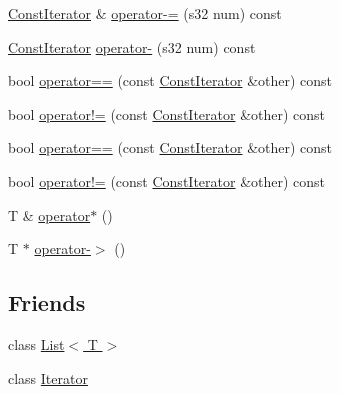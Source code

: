 \begin{DoxyCompactItemize}
\item 
\hyperlink{class_agmd_utilities_1_1_list_1_1_const_iterator}{Const\+Iterator} \& \hyperlink{class_agmd_utilities_1_1_list_1_1_const_iterator_a3325138dc4e9335f8e50ce70900dbd2d}{operator-\/=} (s32 num) const 
\item 
\hyperlink{class_agmd_utilities_1_1_list_1_1_const_iterator}{Const\+Iterator} \hyperlink{class_agmd_utilities_1_1_list_1_1_const_iterator_a3ae88da82c7e9235d90942916d885ab2}{operator-\/} (s32 num) const 
\item 
bool \hyperlink{class_agmd_utilities_1_1_list_1_1_const_iterator_a43fc2c295746d2aa33a10a18ee7a9919}{operator==} (const \hyperlink{class_agmd_utilities_1_1_list_1_1_const_iterator}{Const\+Iterator} \&other) const 
\item 
bool \hyperlink{class_agmd_utilities_1_1_list_1_1_const_iterator_a87ce385b17449da0bc51b59b178933ce}{operator!=} (const \hyperlink{class_agmd_utilities_1_1_list_1_1_const_iterator}{Const\+Iterator} \&other) const 
\item 
bool \hyperlink{class_agmd_utilities_1_1_list_1_1_const_iterator_a43fc2c295746d2aa33a10a18ee7a9919}{operator==} (const \hyperlink{class_agmd_utilities_1_1_list_1_1_const_iterator}{Const\+Iterator} \&other) const 
\item 
bool \hyperlink{class_agmd_utilities_1_1_list_1_1_const_iterator_a87ce385b17449da0bc51b59b178933ce}{operator!=} (const \hyperlink{class_agmd_utilities_1_1_list_1_1_const_iterator}{Const\+Iterator} \&other) const 
\item 
T \& \hyperlink{class_agmd_utilities_1_1_list_1_1_const_iterator_ab7c88729adb6d793c53d10eb519248ab}{operator$\ast$} ()
\item 
T $\ast$ \hyperlink{class_agmd_utilities_1_1_list_1_1_const_iterator_ac10e9811fe7af39d6dfe0a4be2272690}{operator-\/$>$} ()
\end{DoxyCompactItemize}
\subsection*{Friends}
\begin{DoxyCompactItemize}
\item 
class \hyperlink{class_agmd_utilities_1_1_list_1_1_const_iterator_adfa51a0eca1eba953f68ca3f65cdaa05}{List$<$ T $>$}
\item 
class \hyperlink{class_agmd_utilities_1_1_list_1_1_const_iterator_a9830fc407400559db7e7783cc10a9394}{Iterator}
\end{DoxyCompactItemize}


